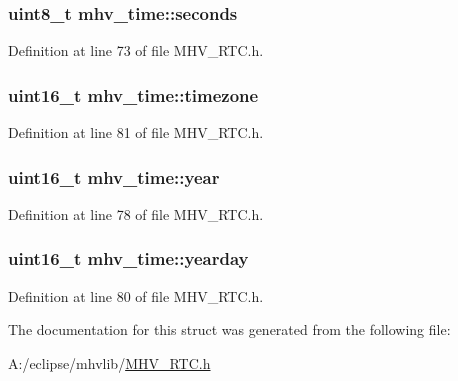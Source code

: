 \hypertarget{structmhv__time_a4844293af0a3648391fb9335f2aa758c}{
\subsubsection[{seconds}]{\setlength{\rightskip}{0pt plus 5cm}uint8\-\_\-t mhv\-\_\-time\-::seconds}}\label{structmhv__time_a4844293af0a3648391fb9335f2aa758c}


Definition at line 73 of file M\-H\-V\-\_\-\-R\-T\-C.\-h.

\hypertarget{structmhv__time_abe9ad1b2bfd43e6688c07367a279c50b}{
\subsubsection[{timezone}]{\setlength{\rightskip}{0pt plus 5cm}uint16\-\_\-t mhv\-\_\-time\-::timezone}}\label{structmhv__time_abe9ad1b2bfd43e6688c07367a279c50b}


Definition at line 81 of file M\-H\-V\-\_\-\-R\-T\-C.\-h.

\hypertarget{structmhv__time_ab5441551ca64fde709afdc98fa5c851e}{
\subsubsection[{year}]{\setlength{\rightskip}{0pt plus 5cm}uint16\-\_\-t mhv\-\_\-time\-::year}}\label{structmhv__time_ab5441551ca64fde709afdc98fa5c851e}


Definition at line 78 of file M\-H\-V\-\_\-\-R\-T\-C.\-h.

\hypertarget{structmhv__time_aa5e9d8969550c007c40f6b2dd404d3d6}{
\subsubsection[{yearday}]{\setlength{\rightskip}{0pt plus 5cm}uint16\-\_\-t mhv\-\_\-time\-::yearday}}\label{structmhv__time_aa5e9d8969550c007c40f6b2dd404d3d6}


Definition at line 80 of file M\-H\-V\-\_\-\-R\-T\-C.\-h.



The documentation for this struct was generated from the following file\-:\begin{DoxyCompactItemize}
\item 
A\-:/eclipse/mhvlib/\hyperlink{_m_h_v___r_t_c_8h}{M\-H\-V\-\_\-\-R\-T\-C.\-h}\end{DoxyCompactItemize}

